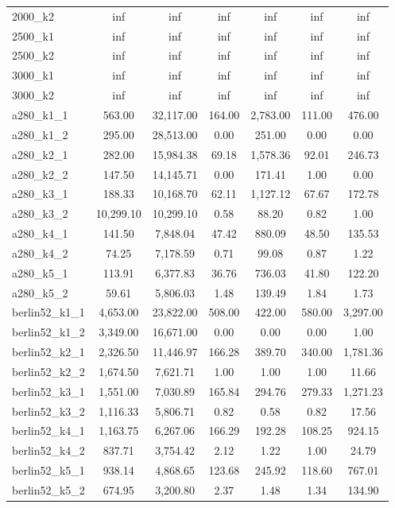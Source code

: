 \documentclass{article}
\begin{document}
\begin{center}
\begin{tabular}{|l|c|c|c|c|c|c|}
2000\_k2 & inf & inf & inf & inf & inf & inf \\
2500\_k1 & inf & inf & inf & inf & inf & inf \\
2500\_k2 & inf & inf & inf & inf & inf & inf \\
3000\_k1 & inf & inf & inf & inf & inf & inf \\
3000\_k2 & inf & inf & inf & inf & inf & inf \\
a280\_k1\_1 & 563.00 & 32,117.00 & 164.00 & 2,783.00 & 111.00 & 476.00 \\
a280\_k1\_2 & 295.00 & 28,513.00 & 0.00 & 251.00 & 0.00 & 0.00 \\
a280\_k2\_1 & 282.00 & 15,984.38 & 69.18 & 1,578.36 & 92.01 & 246.73 \\
a280\_k2\_2 & 147.50 & 14,145.71 & 0.00 & 171.41 & 1.00 & 0.00 \\
a280\_k3\_1 & 188.33 & 10,168.70 & 62.11 & 1,127.12 & 67.67 & 172.78 \\
a280\_k3\_2 & 10,299.10 & 10,299.10 & 0.58 & 88.20 & 0.82 & 1.00 \\
a280\_k4\_1 & 141.50 & 7,848.04 & 47.42 & 880.09 & 48.50 & 135.53 \\
a280\_k4\_2 & 74.25 & 7,178.59 & 0.71 & 99.08 & 0.87 & 1.22 \\
a280\_k5\_1 & 113.91 & 6,377.83 & 36.76 & 736.03 & 41.80 & 122.20 \\
a280\_k5\_2 & 59.61 & 5,806.03 & 1.48 & 139.49 & 1.84 & 1.73 \\
berlin52\_k1\_1 & 4,653.00 & 23,822.00 & 508.00 & 422.00 & 580.00 & 3,297.00 \\
berlin52\_k1\_2 & 3,349.00 & 16,671.00 & 0.00 & 0.00 & 0.00 & 1.00 \\
berlin52\_k2\_1 & 2,326.50 & 11,446.97 & 166.28 & 389.70 & 340.00 & 1,781.36 \\
berlin52\_k2\_2 & 1,674.50 & 7,621.71 & 1.00 & 1.00 & 1.00 & 11.66 \\
berlin52\_k3\_1 & 1,551.00 & 7,030.89 & 165.84 & 294.76 & 279.33 & 1,271.23 \\
berlin52\_k3\_2 & 1,116.33 & 5,806.71 & 0.82 & 0.58 & 0.82 & 17.56 \\
berlin52\_k4\_1 & 1,163.75 & 6,267.06 & 166.29 & 192.28 & 108.25 & 924.15 \\
berlin52\_k4\_2 & 837.71 & 3,754.42 & 2.12 & 1.22 & 1.00 & 24.79 \\
berlin52\_k5\_1 & 938.14 & 4,868.65 & 123.68 & 245.92 & 118.60 & 767.01 \\
berlin52\_k5\_2 & 674.95 & 3,200.80 & 2.37 & 1.48 & 1.34 & 134.90 \\

\end{tabular}
\end{center}
\end{document}
